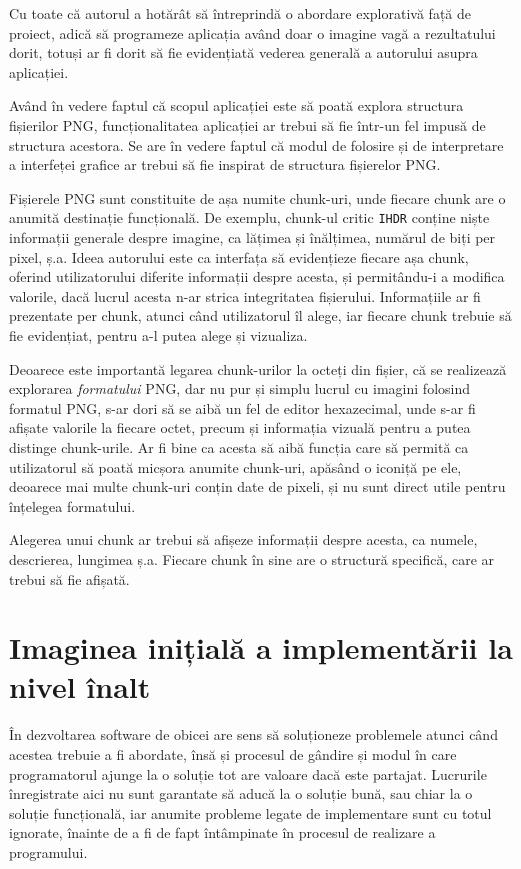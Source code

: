 \documentclass[a4paper,12pt]{report}
\begin{document}
Cu toate că autorul a hotărât să întreprindă o abordare explorativă față de proiect,
adică să programeze aplicația având doar o imagine vagă a rezultatului dorit,
totuși ar fi dorit să fie evidențiată vederea generală a autorului asupra aplicației.

Având în vedere faptul că scopul aplicației este să poată explora structura fișierilor PNG,
funcționalitatea aplicației ar trebui să fie într-un fel impusă de structura acestora.
Se are în vedere faptul că modul de folosire și de interpretare a interfeței grafice 
ar trebui să fie inspirat de structura fișierelor PNG.

Fișierele PNG sunt constituite de așa numite chunk-uri,
unde fiecare chunk are o anumită destinație funcțională.
De exemplu, chunk-ul critic \texttt{IHDR} conține niște informații generale despre imagine,
ca lățimea și înălțimea, numărul de biți per pixel, ș.a.
Ideea autorului este ca interfața să evidențieze fiecare așa chunk,
oferind utilizatorului diferite informații despre acesta,
și permitându-i a modifica valorile, dacă lucrul acesta n-ar strica integritatea fișierului.
Informațiile ar fi prezentate per chunk, atunci când utilizatorul îl alege,
iar fiecare chunk trebuie să fie evidențiat, pentru a-l putea alege și vizualiza.

Deoarece este importantă legarea chunk-urilor la octeți din fișier, că se realizează explorarea
\textit{formatului} PNG, dar nu pur și simplu lucrul cu imagini folosind formatul PNG, s-ar dori să se aibă
un fel de editor hexazecimal, unde s-ar fi afișate valorile la fiecare octet,
precum și informația vizuală pentru a putea distinge chunk-urile.
Ar fi bine ca acesta să aibă funcția care să permită ca utilizatorul să poată micșora anumite chunk-uri,
apăsând o iconiță pe ele, deoarece mai multe chunk-uri conțin date de pixeli,
și nu sunt direct utile pentru înțelegea formatului.

Alegerea unui chunk ar trebui să afișeze informații despre acesta,
ca numele, descrierea, lungimea ș.a.
Fiecare chunk în sine are o structură specifică, care ar trebui să fie afișată.


\section{Imaginea inițială a implementării la nivel înalt}

În dezvoltarea software de obicei are sens să soluționeze
problemele atunci când acestea trebuie a fi abordate,
însă și procesul de gândire și modul în care programatorul ajunge la o soluție
tot are valoare dacă este partajat.
Lucrurile înregistrate aici nu sunt garantate să aducă la o soluție bună,
sau chiar la o soluție funcțională, iar anumite probleme legate de implementare
sunt cu totul ignorate, înainte de a fi de fapt întâmpinate în procesul de realizare a programului.
\end{document}
